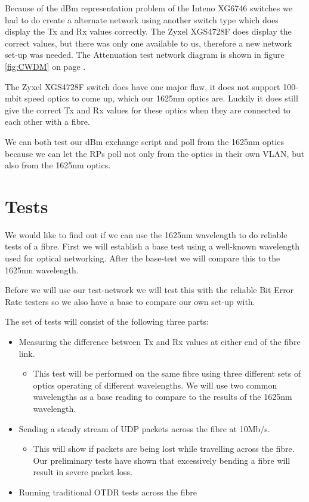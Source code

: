\documentclass{article}
\begin{document}
Because of the dBm representation problem of the Inteno XG6746 switches we had to do create a alternate network using another switch type which does display the Tx and Rx values correctly. The Zyxel XGS4728F does display the correct values, but there was only one available to us, therefore a new network set-up was needed. The Attenuation test network diagram is shown in figure \ref{fig:CWDM} on page \pageref{fig:CWDM}.

The Zyxel XGS4728F switch does have one major flaw, it does not support 100-mbit speed optics to come up, which our 1625nm optics are. Luckily it does still give the correct Tx and Rx values for these optics when they are connected to each other with a fibre.

We can both test our dBm exchange script and poll from the 1625nm optics because we can let the RPs poll not only from the optics in their own VLAN, but also from the 1625nm optics.

\newpage
\section{Tests}
We would like to find out if we can use the 1625nm wavelength to do reliable tests of a fibre. First we will establish a base test using a well-known wavelength used for optical networking. After the base-test we will compare this to the 1625nm wavelength.

Before we will use our test-network we will test this with the reliable Bit Error Rate testers so we also have a base to compare our own set-up with.

The set of tests will consist of the following three parts:
\begin{itemize}
\item Measuring the difference between Tx and Rx values at either end of the fibre link.
	\begin{itemize}
	\item This test will be performed on the same fibre using three different sets of optics operating of different wavelengths.  We will use two common wavelengths as a base reading to compare to the results of the 1625nm wavelength.
	\end{itemize}
\item Sending a steady stream of UDP packets across the fibre at 10Mb/s.
	\begin{itemize}
	\item This will show if packets are being lost while travelling across the fibre. Our preliminary tests have shown that excessively bending a fibre will result in severe packet loss.
	\end{itemize}
\item Running traditional OTDR tests across the fibre
\end{itemize}
\end{document}
